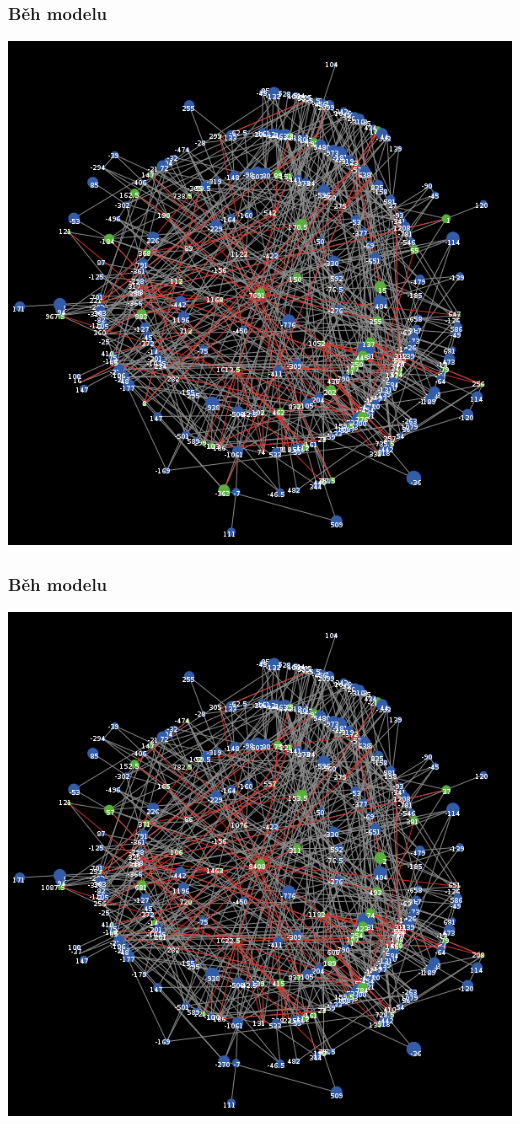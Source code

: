 \documentclass[xcolor=dvipsnames]{beamer}
\begin{document}
  \begin{frame}
    \frametitle{Běh modelu}
    \includegraphics[width=0.6\paperwidth]{18.png}
  \end{frame}
    \begin{frame}
    \frametitle{Běh modelu}
    \includegraphics[width=0.6\paperwidth]{19.png}
  \end{frame}
\end{document}
